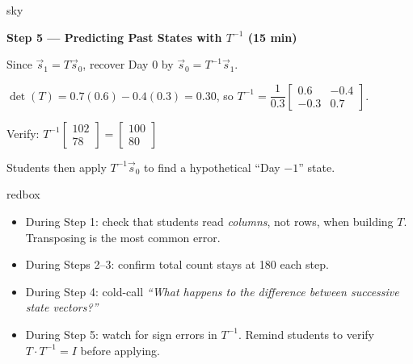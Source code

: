 \documentclass[10pt]{article}
\begin{document}
\begin{skillbox}{sky}

\noindent\textbf{Step 5 --- Predicting Past States with $T^{-1}$ (15 min)}

Since $\vec{s}_1 = T\vec{s}_0$, recover Day 0 by $\vec{s}_0 = T^{-1}\vec{s}_1$.

$\det(T) = 0.7(0.6) - 0.4(0.3) = 0.30$, so
$T^{-1} = \dfrac{1}{0.3}\begin{bmatrix}0.6 & -0.4 \\ -0.3 & 0.7\end{bmatrix}$.

Verify: $T^{-1}\begin{bmatrix}102\\78\end{bmatrix} = \begin{bmatrix}100\\80\end{bmatrix}$ \checkmark

Students then apply $T^{-1}\vec{s}_0$ to find a hypothetical ``Day $-1$'' state.
\end{skillbox}

\begin{skillbox}{redbox}
\begin{itemize}[leftmargin=1.4em, itemsep=2pt]
  \item During Step 1: check that students read \emph{columns}, not rows, when building $T$. Transposing is the most common error.
  \item During Steps 2--3: confirm total count stays at 180 each step.
  \item During Step 4: cold-call \textit{``What happens to the \emph{difference} between successive state vectors?''}
  \item During Step 5: watch for sign errors in $T^{-1}$. Remind students to verify $T\cdot T^{-1} = I$ before applying.
\end{itemize}
\end{skillbox}
\end{document}
